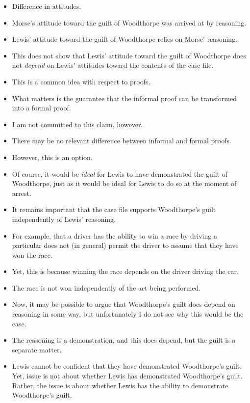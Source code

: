 \documentclass[10pt]{article}
\begin{document}
\begin{itemize}
\item Difference in attitudes.
\item Morse's attitude toward the guilt of Woodthorpe was arrived at by reasoning.
\item Lewis' attitude toward the guilt of Woodthorpe relies on Morse' reasoning.
\item This does not show that Lewis' attitude toward the guilt of Woodthorpe does not \emph{depend} on Lewis' attitudes toward the contents of the case file.
\end{itemize}

\begin{itemize}
\item This is a common idea with respect to proofs.
\item What matters is the guarantee that the informal proof can be transformed into a formal proof.
\item I am not committed to this claim, however.
\item There may be no relevant difference between informal and formal proofs.
\item However, this is an option.
\end{itemize}

\begin{itemize}
\item Of course, it would be \emph{ideal} for Lewis to have demonstrated the guilt of Woodthorpe, just as it would be ideal for Lewis to do so at the moment of arrest.
\end{itemize}

\begin{itemize}
\item It remains important that the case file supports Woodthorpe's guilt independently of Lewis' reasoning.
\item For example, that a driver has the ability to win a race by driving a particular does not (in general) permit the driver to assume that they have won the race.
\item Yet, this is because winning the race depends on the driver driving the car.
\item The race is not won independently of the act being performed.
\item Now, it may be possible to argue that Woodthorpe's guilt does depend on reasoning in some way, but unfortunately I do not see why this would be the case.
\item The reasoning is a demonstration, and this does depend, but the guilt is a separate matter.
\item Lewis cannot be confident that they have demonstrated Woodthorpe's guilt.
  Yet, issue is not about whether Lewis has demonstrated Woodthorpe's guilt.
  Rather, the issue is about whether Lewis has the ability to demonstrate Woodthorpe's guilt.
\end{itemize}
\end{document}
